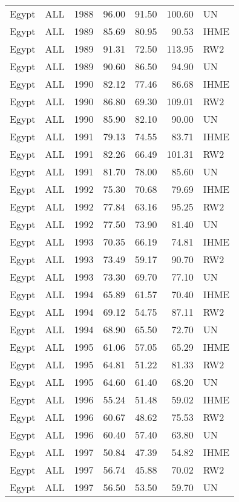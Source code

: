 \begin{longtable}{lllrrrl}
  Egypt & ALL & 1988 & 96.00 & 91.50 & 100.60 & UN \\ 
  Egypt & ALL & 1989 & 85.69 & 80.95 & 90.53 & IHME \\ 
  Egypt & ALL & 1989 & 91.31 & 72.50 & 113.95 & RW2 \\ 
  Egypt & ALL & 1989 & 90.60 & 86.50 & 94.90 & UN \\ 
  Egypt & ALL & 1990 & 82.12 & 77.46 & 86.68 & IHME \\ 
  Egypt & ALL & 1990 & 86.80 & 69.30 & 109.01 & RW2 \\ 
  Egypt & ALL & 1990 & 85.90 & 82.10 & 90.00 & UN \\ 
  Egypt & ALL & 1991 & 79.13 & 74.55 & 83.71 & IHME \\ 
  Egypt & ALL & 1991 & 82.26 & 66.49 & 101.31 & RW2 \\ 
  Egypt & ALL & 1991 & 81.70 & 78.00 & 85.60 & UN \\ 
  Egypt & ALL & 1992 & 75.30 & 70.68 & 79.69 & IHME \\ 
  Egypt & ALL & 1992 & 77.84 & 63.16 & 95.25 & RW2 \\ 
  Egypt & ALL & 1992 & 77.50 & 73.90 & 81.40 & UN \\ 
  Egypt & ALL & 1993 & 70.35 & 66.19 & 74.81 & IHME \\ 
  Egypt & ALL & 1993 & 73.49 & 59.17 & 90.70 & RW2 \\ 
  Egypt & ALL & 1993 & 73.30 & 69.70 & 77.10 & UN \\ 
  Egypt & ALL & 1994 & 65.89 & 61.57 & 70.40 & IHME \\ 
  Egypt & ALL & 1994 & 69.12 & 54.75 & 87.11 & RW2 \\ 
  Egypt & ALL & 1994 & 68.90 & 65.50 & 72.70 & UN \\ 
  Egypt & ALL & 1995 & 61.06 & 57.05 & 65.29 & IHME \\ 
  Egypt & ALL & 1995 & 64.81 & 51.22 & 81.33 & RW2 \\ 
  Egypt & ALL & 1995 & 64.60 & 61.40 & 68.20 & UN \\ 
  Egypt & ALL & 1996 & 55.24 & 51.48 & 59.02 & IHME \\ 
  Egypt & ALL & 1996 & 60.67 & 48.62 & 75.53 & RW2 \\ 
  Egypt & ALL & 1996 & 60.40 & 57.40 & 63.80 & UN \\ 
  Egypt & ALL & 1997 & 50.84 & 47.39 & 54.82 & IHME \\ 
  Egypt & ALL & 1997 & 56.74 & 45.88 & 70.02 & RW2 \\ 
  Egypt & ALL & 1997 & 56.50 & 53.50 & 59.70 & UN \\ 

\end{longtable}
